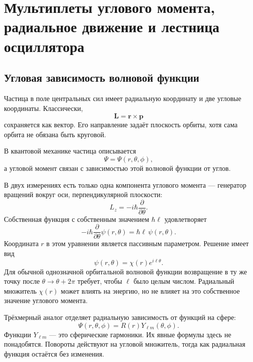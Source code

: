 \chapter{Мультиплеты углового момента, радиальное движение и лестница осциллятора}

\section{Угловая зависимость волновой функции}

Частица в поле центральных сил имеет радиальную координату и две угловые координаты. Классически,
\begin{equation}
\mathbf L=\mathbf r\times\mathbf p
\end{equation}
сохраняется как вектор. Его направление задаёт плоскость орбиты, хотя сама орбита не обязана быть круговой.

В квантовой механике частица описывается
\begin{equation}
\Psi=\Psi(r,\theta,\phi),
\end{equation}
а угловой момент связан с зависимостью этой волновой функции от углов.

В двух измерениях есть только одна компонента углового момента — генератор вращений вокруг оси, перпендикулярной плоскости:
\begin{equation}
L_z=-i\hbar\frac{\partial}{\partial\theta}.
\end{equation}
Собственная функция с собственным значением \(\hbar\ell\) удовлетворяет
\begin{equation}
-i\hbar\frac{\partial}{\partial\theta}\psi(r,\theta)
=\hbar\ell\,\psi(r,\theta).
\end{equation}
Координата \(r\) в этом уравнении является пассивным параметром. Решение имеет вид
\begin{equation}
\psi(r,\theta)=\chi(r)e^{i\ell\theta}.
\end{equation}
Для обычной однозначной орбитальной волновой функции возвращение в ту же точку после \(\theta\to\theta+2\pi\) требует, чтобы \(\ell\) было целым числом. Радиальный множитель \(\chi(r)\) может влиять на энергию, но не влияет на это собственное значение углового момента.

Трёхмерный аналог отделяет радиальную зависимость от функций на сфере:
\begin{equation}
\Psi(r,\theta,\phi)=R(r)Y_{\ell m}(\theta,\phi).
\end{equation}
Функции \(Y_{\ell m}\) — это сферические гармоники. Их явные формулы здесь не понадобятся. Повороты действуют на угловой множитель, тогда как радиальная функция остаётся без изменения.

